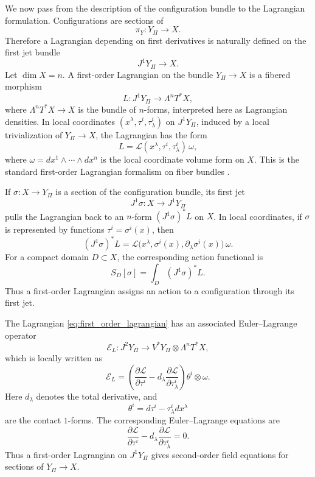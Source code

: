 \documentclass[11pt]{amsart}
\theoremstyle{plain}
\theoremstyle{definition}
\theoremstyle{remark}
\begin{document}
We now pass from the description of the configuration bundle to the Lagrangian formulation. 
Configurations are sections of
\[
\pi_Y:Y_\Pi\to X.
\]
Therefore a Lagrangian depending on first derivatives is naturally defined on the first jet bundle
\[
J^1Y_\Pi\to X.
\]
Let \(\dim X=n\). 
A first-order Lagrangian on the bundle \(Y_\Pi\to X\) is a fibered morphism
\begin{equation}
	L:J^1Y_\Pi\to \Lambda^nT^*X,
	\label{eq:first_order_lagrangian}
\end{equation}
where \(\Lambda^nT^*X\to X\) is the bundle of \(n\)-forms, interpreted here as Lagrangian densities. 
In local coordinates \((x^\lambda,\tau^i,\tau^i_\lambda)\) on \(J^1Y_\Pi\), induced by a local trivialization of \(Y_\Pi\to X\), the Lagrangian has the form
\begin{equation}
	L=\mathcal L(x^\lambda,\tau^i,\tau^i_\lambda)\,\omega,
	\label{eq:first_order_lagrangian_density}
\end{equation}
where \(\omega=dx^1\wedge\cdots\wedge dx^n\) is the local coordinate volume form on \(X\). 
This is the standard first-order Lagrangian formalism on fiber bundles \cite{SardanashvilyBook,GiachettaBook}.

If \(\sigma:X\to Y_\Pi\) is a section of the configuration bundle, its first jet
\[
J^1\sigma:X\to J^1Y_\Pi
\]
pulls the Lagrangian back to an \(n\)-form \((J^1\sigma)^*L\) on \(X\). 
In local coordinates, if \(\sigma\) is represented by functions \(\tau^i=\sigma^i(x)\), then
\[
(J^1\sigma)^*L
=
\mathcal L\bigl(x^\lambda,\sigma^i(x),\partial_\lambda\sigma^i(x)\bigr)\,\omega.
\]
For a compact domain \(D\subset X\), the corresponding action functional is
\begin{equation}
	S_D[\sigma]=\int_D (J^1\sigma)^*L.
	\label{eq:action_functional}
\end{equation}
Thus a first-order Lagrangian assigns an action to a configuration through its first jet.

\medskip

The Lagrangian \eqref{eq:first_order_lagrangian} has an associated Euler--Lagrange operator
\begin{equation}
	\mathcal E_L:J^2Y_\Pi\to V^*Y_\Pi\otimes \Lambda^nT^*X,
	\label{eq:EL_operator}
\end{equation}
which is locally written as
\begin{equation}
	\mathcal E_L
	=
	\left(
	\frac{\partial \mathcal L}{\partial \tau^i}
	-
	d_\lambda\frac{\partial \mathcal L}{\partial \tau^i_\lambda}
	\right)
	\theta^i\otimes \omega.
	\label{eq:EL_operator_local}
\end{equation}
Here \(d_\lambda\) denotes the total derivative, and
\[
\theta^i=d\tau^i-\tau^i_\lambda dx^\lambda
\]
are the contact \(1\)-forms. The corresponding Euler--Lagrange equations are
\begin{equation}
	\frac{\partial \mathcal L}{\partial \tau^i}
	-
	d_\lambda\frac{\partial \mathcal L}{\partial \tau^i_\lambda}
	=0.
	\label{eq:EL_equations}
\end{equation}
Thus a first-order Lagrangian on \(J^1Y_\Pi\) gives second-order field equations for sections of \(Y_\Pi\to X\).
\end{document}
